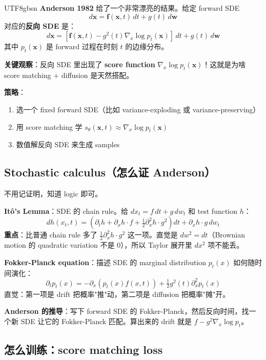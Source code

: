 \documentclass[11pt]{article}
\begin{document}
\begin{CJK}{UTF8}{gbsn}
\textbf{Anderson 1982} 给了一个非常漂亮的结果。给定 forward SDE
\[
d\mathbf{x} = \mathbf{f}(\mathbf{x}, t) \, dt + g(t) \, d\mathbf{w}
\]
对应的\textbf{反向 SDE} 是：
\[
\boxed{d\mathbf{x} = [\mathbf{f}(\mathbf{x}, t) - g^2(t) \nabla_x \log p_t(\mathbf{x})] \, dt + g(t) \, d\mathbf{w}}
\]
其中 $p_t(\mathbf{x})$ 是 forward 过程在时刻 $t$ 的边缘分布。

\textbf{关键观察}：反向 SDE 里出现了 \textbf{score function} $\nabla_x \log p_t(\mathbf{x})$！这就是为啥 score matching + diffusion 是天然搭配。

\textbf{策略}：
\begin{enumerate}[nosep]
  \item 选一个 fixed forward SDE（比如 variance-exploding 或 variance-preserving）
  \item 用 score matching 学 $s_\theta(\mathbf{x}, t) \approx \nabla_x \log p_t(\mathbf{x})$
  \item 数值解反向 SDE 来生成 samples
\end{enumerate}

\subsection{Stochastic calculus（怎么证 Anderson）}

不用记证明，知道 logic 即可。

\textbf{Itô's Lemma}：SDE 的 chain rule。给 $dx_t = f \, dt + g \, dw_t$ 和 test function $h$：
\[
dh(x_t, t) = \left(\partial_t h + \partial_x h \cdot f + \tfrac{1}{2} \partial_x^2 h \cdot g^2\right) dt + \partial_x h \cdot g \, dw_t
\]
\textbf{重点}：比普通 chain rule 多了 $\frac{1}{2} \partial_x^2 h \cdot g^2$ 这一项。直觉是 $dw^2 = dt$（Brownian motion 的 quadratic variation 不是 $0$），所以 Taylor 展开里 $dx^2$ 项不能丢。

\textbf{Fokker-Planck equation}：描述 SDE 的 marginal distribution $p_t(x)$ 如何随时间演化：
\[
\partial_t p_t(x) = -\partial_x(p_t(x) f(x, t)) + \tfrac{1}{2} g^2(t) \partial_x^2 p_t(x)
\]
直觉：第一项是 drift 把概率"推"动，第二项是 diffusion 把概率"摊"开。

\textbf{Anderson 的推导}：写下 forward SDE 的 Fokker-Planck，然后反向时间，找一个新 SDE 让它的 Fokker-Planck 匹配。算出来的 drift 就是 $f - g^2 \nabla_x \log p_t$。

\subsection{怎么训练：score matching loss}


\end{CJK}
\end{document}
